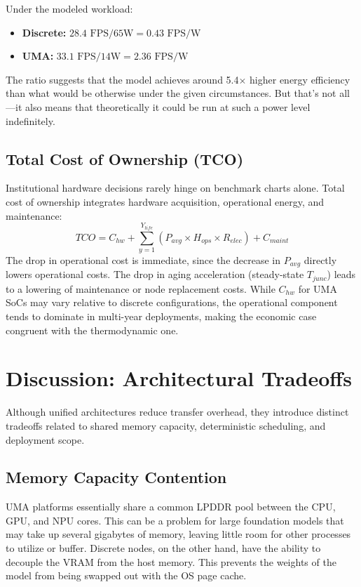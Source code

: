 \documentclass[conference]{IEEEtran}
\begin{document}
Under the modeled workload:
\begin{itemize}
    \item \textbf{Discrete:} $28.4 \text{ FPS} / 65\text{W} = 0.43 \text{ FPS/W}$
    \item \textbf{UMA:} $33.1 \text{ FPS} / 14\text{W} = 2.36 \text{ FPS/W}$
\end{itemize}
The ratio suggests that the model achieves around 5.4$\times$ higher energy efficiency than what would be otherwise under the given circumstances. But that's not all---it also means that theoretically it could be run at such a power level indefinitely.

\subsection{Total Cost of Ownership (TCO)}
Institutional hardware decisions rarely hinge on benchmark charts alone. Total cost of ownership integrates hardware acquisition, operational energy, and maintenance:
\begin{equation}
TCO = C_{hw} + \sum_{y=1}^{Y_{life}} (P_{avg} \times H_{ops} \times R_{elec}) + C_{maint}
\end{equation}
The drop in operational cost is immediate, since the decrease in $P_{avg}$ directly lowers operational costs. The drop in aging acceleration (steady-state $T_{junc}$) leads to a lowering of maintenance or node replacement costs. While $C_{hw}$ for UMA SoCs may vary relative to discrete configurations, the operational component tends to dominate in multi-year deployments, making the economic case congruent with the thermodynamic one.

\section{Discussion: Architectural Tradeoffs}

Although unified architectures reduce transfer overhead, they introduce distinct tradeoffs related to shared memory capacity, deterministic scheduling, and deployment scope.

\subsection{Memory Capacity Contention}
UMA platforms essentially share a common LPDDR pool between the CPU, GPU, and NPU cores. This can be a problem for large foundation models that may take up several gigabytes of memory, leaving little room for other processes to utilize or buffer. Discrete nodes, on the other hand, have the ability to decouple the VRAM from the host memory. This prevents the weights of the model from being swapped out with the OS page cache.
\end{document}
